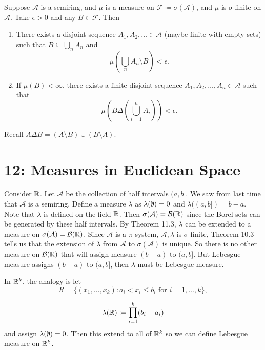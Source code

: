 \documentclass[class=article,crop=false]{standalone}
\begin{document}
\begin{thm}
	Suppose $\mathcal{A} $ is a semiring, and $ \mu$ is a measure on $ \mathcal{F} \coloneqq \sigma(\mathcal{A})$, and $ \mu$ is $ \sigma$-finite on $ \mathcal{A}$. Take $ \epsilon> 0$ and any $ B \in \mathcal{F}$. Then
	\begin{enumerate}[label=(\roman*)]
		\item There exists a disjoint sequence $ A_1, A_2,\ldots \in \mathcal{A}$ (maybe finite with empty sets) such that $ B \subseteq \bigcup_{ n} A_n $ and 
			\[
				\mu\left( \bigcup_n A_n \setminus B  \right) < \epsilon 
			.\] 
		\item If $ \mu(B) < \infty$, there exists a finite disjoint sequence $ A_1, A_2,\ldots,A_n \in \mathcal{A}$ such that 
			\[
				\mu\left( B \Delta \left( \bigcup_{ i= 1}^{ n} A_i \right)  \right) < \epsilon 
			.\] 
	\end{enumerate}
\end{thm}
\begin{note}[]
	Recall $ A \Delta B = (A \setminus B) \cup (B \setminus A)$.
\end{note}

\section*{12: Measures in Euclidean Space}

\begin{eg}[]
	Consider $ \mathbb{R}$. Let $ \mathcal{A}$ be the collection of half intervals $ (a,b]$. We saw from last time that  $ \mathcal{A}$ is a semiring. Define a measure  $ \lambda$ as $ \lambda( \emptyset) =0 $ and $ \lambda((a,b])=b-a$. Note that $ \lambda$ is defined on the field $ \mathbb{R}$. Then $ \sigma(\mathcal{A})= \mathcal{B}( \mathbb{R})$ since the Borel sets can be generated by these half intervals. By Theorem 11.3, $ \lambda$ can be extended to a measure on $ \sigma(\mathcal{A}) = \mathcal{B}(\mathbb{R})$. Since $ \mathcal{A}$ is a $\pi$-system, $ \mathcal{A}, \lambda$ is $\sigma$-finite, Theorem 10.3 tells us that the extension of $ \lambda$ from $ \mathcal{A}$ to $ \sigma(\mathcal{A})$ is unique. So there is no other measure on $ \mathcal{B}( \mathbb{R})$ that will assign measure $ (b-a)$ to  $ (a,b]$. But Lebesgue measure assigns  $ (b-a)$ to  $ (a,b]$, then  $ \lambda $ must be Lebesgue measure.
\end{eg}

\begin{eg}[]
In $ \mathbb{R}^{k}$, the analogy is let
\[
	R = \{(x_1,\ldots,x_k): a_i< x_i \leq b_i \text{ for } i=1,\ldots,k \}  
,\] 

\[
	\lambda( \mathbb{R}) \coloneqq \prod_{i=1}^k (b_i-a_i)
\] 
and assign $ \lambda( \emptyset) = 0$. Then this extend to all of $ \mathbb{R}^{k}$ so we can define Lebesgue measure on $ \mathbb{R}^{k}$.
\end{eg}
\end{document}
